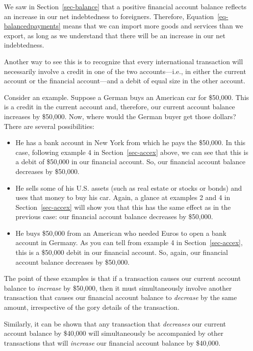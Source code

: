 \documentclass[
  letterpaper,
]{book}
\providecommand{\tightlist}{%
  \setlength{\itemsep}{0pt}\setlength{\parskip}{0pt}}\usepackage{longtable,booktabs,array}
\theoremstyle{plain}
\theoremstyle{remark}
\begin{document}
We saw in Section~\ref{sec-balance} that a positive financial account
balance reflects an increase in our net indebtedness to foreigners.
Therefore, Equation~\ref{eq-balancedpayments} means that we can import
more goods and services than we export, as long as we understand that
there will be an increase in our net indebtedness.

Another way to see this is to recognize that every international
transaction will necessarily involve a credit in one of the two
accounts---i.e., in either the current account or the financial
account---and a debit of equal size in the other account.

Consider an example. Suppose a German buys an American car for \$50,000.
This is a credit in the current account and, therefore, our current
account balance increases by \$50,000. Now, where would the German buyer
get those dollars? There are several possibilities:

\begin{itemize}
\tightlist
\item
  He has a bank account in New York from which he pays the \$50,000. In
  this case, following example 4 in Section~\ref{sec-accex} above, we
  can see that this is a debit of \$50,000 in our financial account. So,
  our financial account balance decreases by \$50,000.
\item
  He sells some of his U.S. assets (such as real estate or stocks or
  bonds) and uses that money to buy his car. Again, a glance at examples
  2 and 4 in Section~\ref{sec-accex} will show you that this has the
  same effect as in the previous case: our financial account balance
  decreases by \$50,000.
\item
  He buys \$50,000 from an American who needed Euros to open a bank
  account in Germany. As you can tell from example 4 in
  Section~\ref{sec-accex}, this is a \$50,000 debit in our financial
  account. So, again, our financial account balance decreases by
  \$50,000.
\end{itemize}

The point of these examples is that if a transaction causes our current
account balance to \emph{increase} by \$50,000, then it must
simultaneously involve another transaction that causes our financial
account balance to \emph{decrease} by the same amount, irrespective of
the gory details of the transaction.

Similarly, it can be shown that any transaction that \emph{decreases}
our current account balance by \$40,000 will simultaneously be
accompanied by other transactions that will \emph{increase} our
financial account balance by \$40,000.
\end{document}
